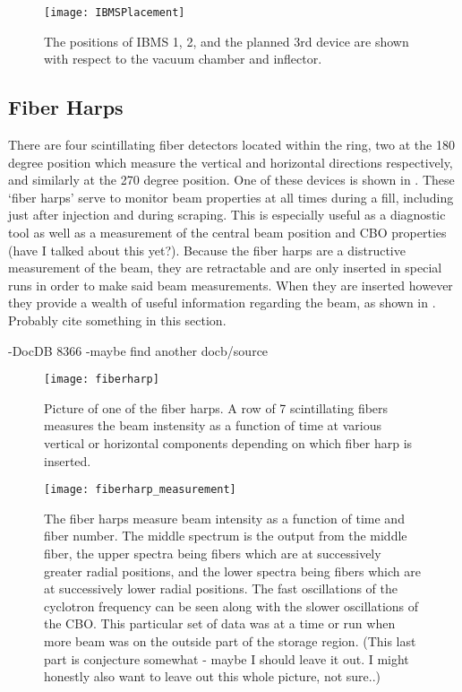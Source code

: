 \begin{figure}[]
    \centering
    \texttt{[image: IBMSPlacement]}
    \caption[IBMS Positions]{The positions of IBMS 1, 2, and the planned 3rd device are shown with respect to the vacuum chamber and inflector.}   
    \label{fig:IBMSPlacement}
\end{figure}



\subsection{Fiber Harps}
\label{sec:FiberHarps}

There are four scintillating fiber detectors located within the ring, two at the 180 degree position which measure the vertical and horizontal directions respectively, and similarly at the 270 degree position. One of these devices is shown in . These `fiber harps' serve to monitor beam properties at all times during a fill, including just after injection and during scraping. This is especially useful as a diagnostic tool as well as a measurement of the central beam position and CBO properties (have I talked about this yet?). Because the fiber harps are a distructive measurement of the beam, they are retractable and are only inserted in special runs in order to make said beam measurements. When they are inserted however they provide a wealth of useful information regarding the beam, as shown in . Probably cite something in this section.

-DocDB 8366
-maybe find another docb/source

\begin{figure}[]
    \centering
    \texttt{[image: fiberharp]}
    \caption[Fiber Harp]{Picture of one of the fiber harps. A row of 7 scintillating fibers measures the beam instensity as a function of time at various vertical or horizontal components depending on which fiber harp is inserted.}   
    \label{fig:fiberharp}
\end{figure}

\begin{figure}[]
    \centering
    \texttt{[image: fiberharp\_measurement]}
    \caption[Fiber Harp Measurement]{The fiber harps measure beam intensity as a function of time and fiber number. The middle spectrum is the output from the middle fiber, the upper spectra being fibers which are at successively greater radial positions, and the lower spectra being fibers which are at successively lower radial positions. The fast oscillations of the cyclotron frequency can be seen along with the slower oscillations of the CBO. This particular set of data was at a time or run when more beam was on the outside part of the storage region. (This last part is conjecture somewhat - maybe I should leave it out. I might honestly also want to leave out this whole picture, not sure..)}   
    \label{fig:fiberharp_measurement}
\end{figure}


